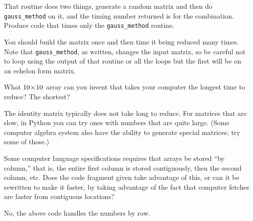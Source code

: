\begin{exercises}
    That routine does two things, generate a random matrix and 
    then do \lstinline[style=inline]!gauss_method! on it, and the 
    timing number returned is for the combination.
    Produce code that times only the 
    \lstinline[style=inline]!gauss_method! routine. 
    \begin{answer}
      You should build the matrix once and then time it being reduced
      many times.
      Note that \lstinline[style=inline]!gauss_method!, as written,
      changes the input matrix, so be careful not to loop using 
      the output of that routine or all the loops but the first will 
      be on an echelon form matrix.
    \end{answer}
  \item 
    What $10 \! \times \! 10$ array can you invent that takes your computer
    the longest time to reduce?
    The shortest?
    \begin{answer}
      The identity matrix typically does not take long to reduce.
      For matrices that are slow, in Python you can try ones with numbers that
      are quite large.
      (Some computer algebra system also have the ability to generate
      special matrices; try some of those.)
    \end{answer}
  \item Some computer language specifications requires that arrays be
    stored ``by column,'' that is, the entire first column is stored
    contiguously, then the second column, etc.
    Does the code fragment given take advantage of this,
    or can it be rewritten to make it faster, by taking advantage of
    the fact that computer fetches are faster from contiguous locations?
    \begin{answer}
      No, the above code handles the numbers by row.
    \end{answer}
\end{exercises}
\endinput
